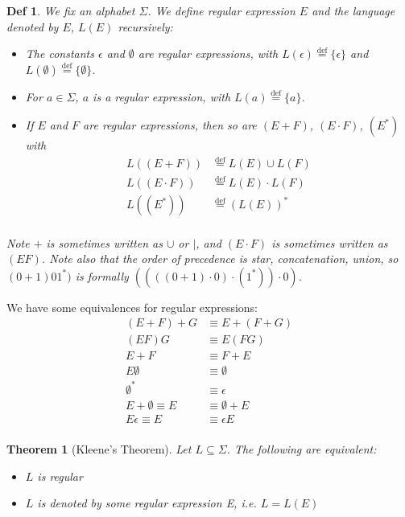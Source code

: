 \documentclass{article}
\newtheorem{thm}{Theorem}
\newtheorem{defn}[dummy]{Def}
\newcommand{\eqdef}[0]{ \overset{\text{def}}{=} }
\begin{document}
    \begin{defn}
        We fix an alphabet $\Sigma$. We define regular expression $E$ and the language denoted by $E$, $L(E)$ recursively:
        \begin{itemize}
            \item The constants $\epsilon$ and $\emptyset$ are regular expressions, with $L(\epsilon) \eqdef \{ \epsilon\}$ and $L(\emptyset) \eqdef \{ \emptyset\}$.
            \item For $a \in \Sigma$, $a$ is a regular expression, with $L(a) \eqdef \{ a \}$.
            \item If $E$ and $F$ are regular expressions, then so are $(E+F)$, $(E \cdot F)$, $(E^*)$ with 
            \begin{align*}
                L((E+F)) &\eqdef L(E) \cup L(F) \tag*{Union} \\
                L((E \cdot F)) &\eqdef L(E) \cdot L(F) \tag*{Concatenation} \\
                L((E^*)) &\eqdef (L(E))^* \tag*{Star} \\
            \end{align*}
        \end{itemize}

        Note $+$ is sometimes written as $\cup$ or $|$, and $(E \cdot F)$ is sometimes written as $(EF)$. Note also that the order of precedence is star, concatenation, union, so $(0 + 1)01^*)$ is formally $((((0+1) \cdot 0) \cdot (1^*)) \cdot 0 )$.
        
    \end{defn}

    We have some equivalences for regular expressions:
    \begin{align*}
        (E + F) + G &\equiv E + (F + G) \tag*{Associativity} \\
        (EF)G &\equiv E(FG) \tag*{Associativity} \\
        E+F &\equiv F+E \tag*{Commutativity} \\ 
        E \emptyset &\equiv \emptyset \\ 
        \emptyset^* &\equiv \epsilon \\
        E + \emptyset \equiv E &\equiv \emptyset + E\\
        E \epsilon \equiv E &\equiv \epsilon E\\
    \end{align*}
    
    \begin{thm}[Kleene's Theorem]
        Let $L \subseteq \Sigma$. The following are equivalent:
        \begin{itemize}
            \item $L$ is regular
            \item $L$ is denoted by some regular expression E, i.e. $L = L(E)$
        \end{itemize}
    \end{thm}
\end{document}
